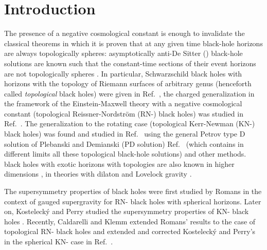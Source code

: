 \documentclass[12pt,a4paper]{article}
\begin{document}
\newpage

\pagestyle{plain}


\section*{Introduction}

The presence of a negative cosmological constant is enough to
invalidate the classical theorems \cite{art:Haw7,art:FSW} in which it
is proven that at any given time black-hole horizons are always
topologically spheres: asymptotically anti-De Sitter (\coordHE{})
black-hole solutions are known such that the constant-time sections of
their event horizons are not topologically spheres
\cite{art:ABHP,art:Man1,art:Man2,art:SM,art:Le1,art:Le2,art:LeZa,art:CaZh,
  art:HL,art:Bir}.  In particular, \coordHE{} Schwarzschild black holes
with horizons with the topology of Riemann surfaces of arbitrary genus
(henceforth called {\it topological} black holes) were given in
Ref.~\cite{art:Va}, the charged generalization in the framework of the
Einstein-Maxwell theory with a negative cosmological constant
(topological \coordHE{} Reissner-Nordstr\"{o}m (RN-\coordHE{}) black holes) was
studied in Ref.~\cite{art:BLP}. The generalization to the rotating
case (topological \coordHE{} Kerr-Newman (KN-\coordHE{}) black holes) was found
and studied in Ref.~\cite{art:KMV} using the general Petrov type D
solution of Plebanski and Demianski (PD solution) Ref.~\cite{art:PD}
(which contains in different limits all these topological black-hole
solutions) and other methods. \coordHE{} black holes with exotic horizons
with topologies are also known in higher dimensions \cite{art:Bir}, in
theories with dilaton \cite{kn:Cai1} and Lovelock gravity
\cite{kn:Cai2}.

The supersymmetry properties of \coordHE{} black holes were first studied
by Romans in the context of \coordHE{} gauged supergravity
\cite{art:Ro} for RN-\coordHE{} black holes with spherical horizons.  Later
on, Kosteleck\'y and Perry studied the supersymmetry properties of
KN-\coordHE{} black holes \cite{art:KP}.  Recently, Caldarelli and Klemm
extended Romans' results to the case of topological RN-\coordHE{} black
holes and extended and corrected Kosteleck\'y and Perry's in the
spherical KN-\coordHE{} case in Ref.~\cite{art:CK}.
\end{document}
